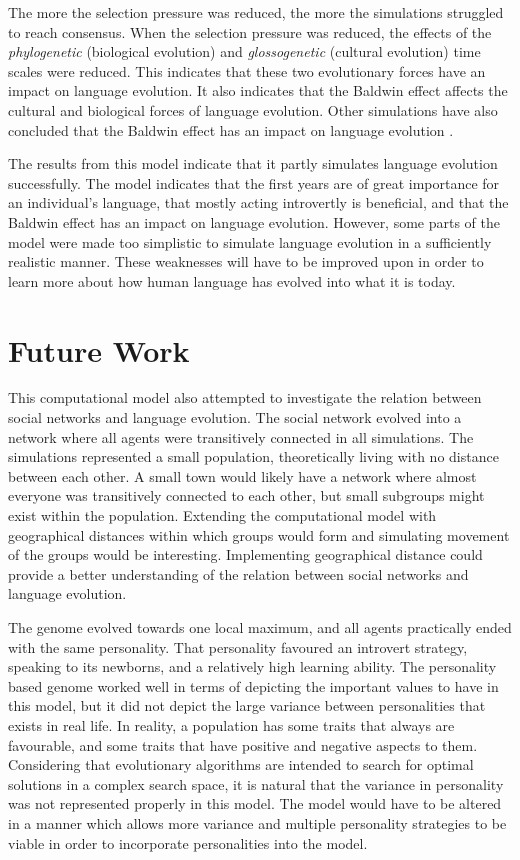 The more the selection pressure was reduced, the more the simulations struggled to reach consensus. When the selection pressure was reduced, the effects of the \textit{phylogenetic} (biological evolution) and \textit{glossogenetic} (cultural evolution) time scales were reduced. This indicates that these two evolutionary forces have an impact on language evolution. It also indicates that the Baldwin effect \citep{baldwin1896new} affects the cultural and biological forces of language evolution. Other simulations have also concluded that the Baldwin effect has an impact on language evolution \citep{lipowska2011naming, zollman2010plasticity, chater2010language}.

The results from this model indicate that it partly simulates language evolution successfully. The model indicates that the first years are of great importance for an individual's language, that mostly acting introvertly is beneficial, and that the Baldwin effect has an impact on language evolution. However, some parts of the model were made too simplistic to simulate language evolution in a sufficiently realistic manner. These weaknesses will have to be improved upon in order to learn more about how human language has evolved into what it is today.
 
\section{Future Work}
This computational model also attempted to investigate the relation between social networks and language evolution. The social network evolved into a network where all agents were transitively connected in all simulations. The simulations represented a small population, theoretically living with no distance between each other. A small town would likely have a network where almost everyone was transitively connected to each other, but small subgroups might exist within the population. Extending the computational model with geographical distances within which groups would form and simulating movement of the groups would be interesting. Implementing geographical distance could provide a better understanding of the relation between social networks and language evolution.
 
The genome evolved towards one local maximum, and all agents practically ended with the same personality. That personality favoured an introvert strategy, speaking to its newborns, and a relatively high learning ability. The personality based genome worked well in terms of depicting the important values to have in this model, but it did not depict the large variance between personalities that exists in real life. In reality, a population has some traits that always are favourable, and some traits that have positive and negative aspects to them. Considering that evolutionary algorithms are intended to search for optimal solutions in a complex search space, it is natural that the variance in personality was not represented properly in this model. The model would have to be altered in a manner which allows more variance and multiple personality strategies to be viable in order to incorporate personalities into the model.  
 
